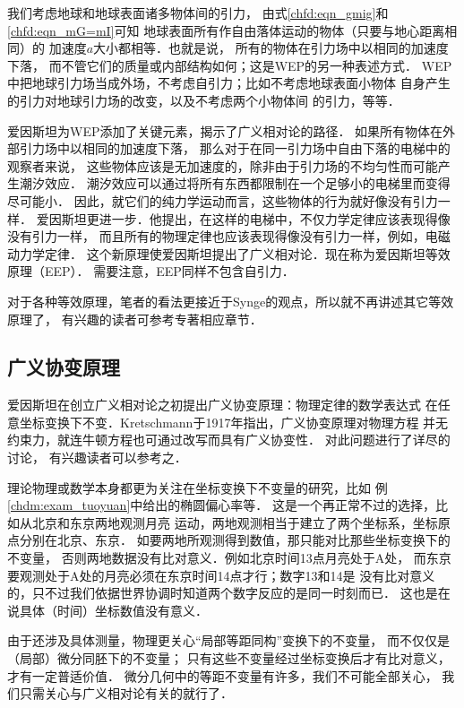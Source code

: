 我们考虑地球和地球表面诸多物体间的引力，
由式\eqref{chfd:eqn_gmig}和\eqref{chfd:eqn_mG=mI}可知
地球表面所有作自由落体运动的物体（只要与地心距离相同）的
加速度$a$大小都相等．也就是说，
所有的物体在引力场中以相同的加速度下落，
而不管它们的质量或内部结构如何；这是WEP的另一种表述方式．
WEP中把地球引力场当成外场，不考虑自引力；比如不考虑地球表面小物体
自身产生的引力对地球引力场的改变，以及不考虑两个小物体间
的引力，等等．



爱因斯坦为WEP添加了关键元素，揭示了广义相对论的路径．
如果所有物体在外部引力场中以相同的加速度下落，
那么对于在同一引力场中自由下落的电梯中的观察者来说，
这些物体应该是无加速度的，除非由于引力场的不均匀性而可能产生潮汐效应．
潮汐效应可以通过将所有东西都限制在一个足够小的电梯里而变得尽可能小．
因此，就它们的纯力学运动而言，这些物体的行为就好像没有引力一样．
爱因斯坦更进一步．他提出，在这样的电梯中，不仅力学定律应该表现得像没有引力一样，
而且所有的物理定律也应该表现得像没有引力一样，例如，电磁动力学定律．
这个新原理使爱因斯坦提出了广义相对论．现在称为爱因斯坦等效原理（EEP）．
需要注意，EEP同样不包含自引力．


对于各种等效原理，笔者的看法更接近于Synge的观点，所以就不再讲述其它等效原理了，
有兴趣的读者可参考专著\parencite{will_tegp-2018}相应章节．



\subsection{广义协变原理}\label{chfd:sec_general-covariance}
爱因斯坦在创立广义相对论之初提出广义协变原理：物理定律的数学表达式
在任意坐标变换下不变．Kretschmann于1917年指出，广义协变原理对物理方程
并无约束力，就连牛顿方程也可通过改写而具有广义协变性．
\textcite[\S 7.1]{ohanian-ruffini-2013}对此问题进行了详尽的讨论，
有兴趣读者可以参考之．


理论物理或数学本身都更为关注在坐标变换下不变量的研究，比如
例\ref{chdm:exam_tuoyuan}中给出的椭圆偏心率等．
这是一个再正常不过的选择，比如从北京和东京两地观测月亮
运动，两地观测相当于建立了两个坐标系，坐标原点分别在北京、东京．
如要两地所观测得到数值，那只能对比那些坐标变换下的不变量，
否则两地数据没有比对意义．例如北京时间13点月亮处于A处，
而东京要观测处于A处的月亮必须在东京时间14点才行；数字13和14是
没有比对意义的，只不过我们依据世界协调时知道两个数字反应的是同一时刻而已．
这也是在说具体（时间）坐标数值没有意义．

由于还涉及具体测量，物理更关心“局部等距同构”变换下的不变量，
而不仅仅是（局部）微分同胚下的不变量；
只有这些不变量经过坐标变换后才有比对意义，才有一定普适价值．
微分几何中的等距不变量有许多，我们不可能全部关心，
我们只需关心与广义相对论有关的就行了．


